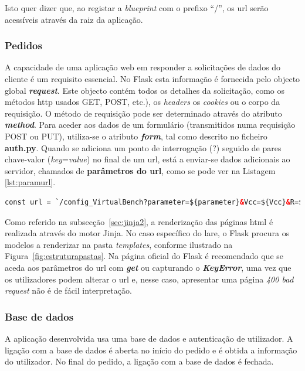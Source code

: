 Isto quer dizer que, ao registar a \textit{blueprint} com o prefixo ``/'', os \acrshort{url} serão acessíveis através da raiz da aplicação.

\subsubsection{Pedidos}
A capacidade de uma aplicação web em responder a solicitações de dados do cliente é um requisito essencial. No Flask esta informação é fornecida pelo objecto global \textit{\textbf{request}}. Este objecto contém todos os detalhes da solicitação, como os métodos \acrshort{http} usados GET, POST, etc.), os \textit{headers} os \textit{cookies} ou o corpo da requisição. O método de requisição pode ser determinado através do atributo \textit{\textbf{method}}. Para aceder aos dados de um formulário (transmitidos numa requisição POST ou PUT), utiliza-se o atributo \textit{\textbf{form}}, tal como descrito no ficheiro \textbf{auth.py}. Quando se adiciona um ponto de interrogação (?) seguido de pares chave-valor (\textit{key}=\textit{value}) no final de um \acrshort{url}, está a enviar-se dados adicionais ao servidor, chamados de \textbf{parâmetros do \acrshort{url}}, como se pode ver na Listagem \ref{lst:paramurl}.

\begin{minipage}{0.9\linewidth}
	\begin{lstlisting}[language=Html, caption=Exemplo argumentos passados ao servidor - ohm.html, label=lst:paramurl]
const url = `/config_VirtualBench?parameter=${parameter}&Vcc=${Vcc}&R=${Resistance}`;
\end{lstlisting}
\end{minipage}

Como referido na subsecção~\ref{sec:jinja2}, a renderização das páginas \acrshort{html} é realizada através do motor Jinja. No caso específico do \acrshort{lare}, o Flask procura os modelos a renderizar na pasta \textit{templates}, conforme ilustrado na Figura~\ref{fig:estruturapastas}. Na página oficial do Flask é recomendado que se aceda aos parâmetros do \acrshort{url} com \textit{\textbf{get}} ou capturando o \textit{\textbf{KeyError}}, uma vez que os utilizadores podem alterar o \acrshort{url} e, nesse caso, apresentar uma página \textit{400 bad request} não é de fácil interpretação.

\subsubsection{Base de dados}
A aplicação desenvolvida usa uma base de dados e autenticação de utilizador. A ligação com a base de dados é aberta no início do pedido e é obtida a informação do utilizador. No final do pedido, a ligação com a base de dados é fechada. 

